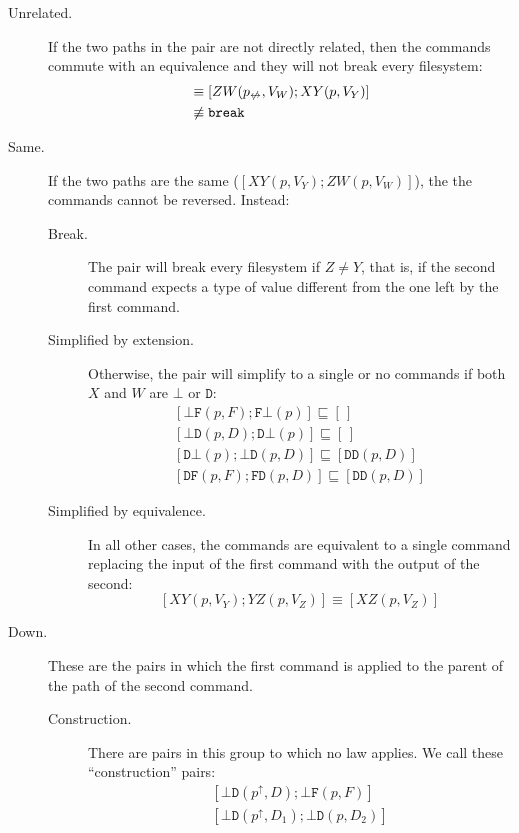 \documentclass[12pt]{article}
\newcommand{\empt}{\bot}
\newcommand{\pp}{p^\uparrow} %
\newcommand{\np}{p_{\centernot\leftrightarrow}} %
\newcommand{\cbrk}{\mathtt{break}}
\newcommand{\fscommand}[2]{{#1#2}}
\newcommand{\fsregcommandchar}[1]{\mathtt{#1}}
\newcommand{\fsregcommand}[2]{\fscommand{\fsregcommandchar{#1}}{\fsregcommandchar{#2}}}
\newcommand{\cbf}{\fsregcommand{\empt}{F}}
\newcommand{\cbd}{\fsregcommand{\empt}{D}}
\newcommand{\cfb}{\fsregcommand{F}{\empt}}
\newcommand{\cfd}{\fsregcommand{F}{D}}
\newcommand{\cdb}{\fsregcommand{D}{\empt}}
\newcommand{\cdf}{\fsregcommand{D}{F}}
\newcommand{\cdd}{\fsregcommand{D}{D}}
\newcommand{\cxy}{\fscommand{X}{Y}}
\newcommand{\cyz}{\fscommand{Y}{Z}}
\newcommand{\cxz}{\fscommand{X}{Z}}
\newcommand{\czw}{\fscommand{Z}{W}}
\newcommand{\eqext}{\sqsubseteq}
\newcommand{\nequiv}{\not\equiv}
\newcommand{\emptyseq}{[\,]}
\theoremstyle{definition}
\begin{document}
\begin{description}
\item[Unrelated.] If the two paths in the pair are not directly related, then
the commands commute with an equivalence and they will not break every filesystem:
\begin{align*}
[\cxy(p,V_Y); \czw(\np,V_W)] &\equiv [\czw(\np,V_W); \cxy(p,V_Y)] \\
&\nequiv \cbrk
\end{align*}
%
\item[Same.] If the two paths are the same ($[\cxy(p,V_Y); \czw(p,V_W)]$), the
the commands cannot be reversed. Instead:
   \begin{description}
   \item[Break.]
   The pair will break every filesystem if $Z\ne Y$, that is, if the second
   command expects a type of value different from the one left by the first command.
   \item[Simplified by extension.]
   Otherwise, the pair will simplify to a single or no commands
   if both $X$ and $W$ are $\fsregcommandchar{\empt}$ or $\fsregcommandchar{D}$:
   \begin{gather*}
            [\cbf(p, F); \cfb(p)] \eqext \emptyseq \\
            [\cbd(p, D); \cdb(p)] \eqext \emptyseq \\
            [\cdb(p); \cbd(p, D)] \eqext [\cdd(p, D)] \\
            [\cdf(p, F); \cfd(p, D)] \eqext [\cdd(p, D)]
   \end{gather*}
   \item[Simplified by equivalence.]
   In all other cases, the commands are equivalent to a single command
   replacing the input of the first command with the output of the second:
   \[ [\cxy(p, V_Y); \cyz(p, V_Z)] \equiv [\cxz(p, V_Z)] \]
   \end{description}
%
\item[Down.]
These are the pairs in which the first command is applied to the parent of the path
of the second command.
   \begin{description}
   \item[Construction.] There are pairs in this group to which no law applies.
   We call these ``construction'' pairs:
   \begin{gather*}
            [\cbd(\pp, D); \cbf(p, F)] \\
            [\cbd(\pp, D_1); \cbd(p, D_2)] \\

\end{gather*}
\end{description}
\end{description}
\end{document}
